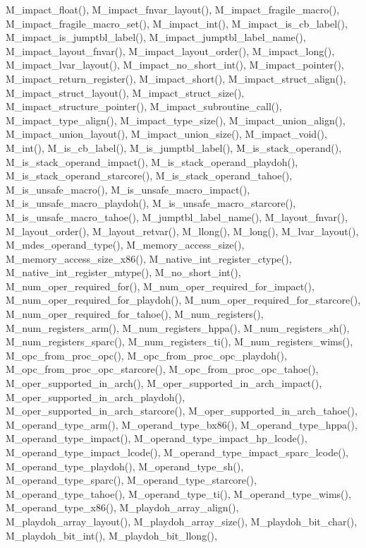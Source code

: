 M\_\-impact\_\-float(), M\_\-impact\_\-fnvar\_\-layout(), M\_\-impact\_\-fragile\_\-macro(), M\_\-impact\_\-fragile\_\-macro\_\-set(), M\_\-impact\_\-int(), M\_\-impact\_\-is\_\-cb\_\-label(), M\_\-impact\_\-is\_\-jumptbl\_\-label(), M\_\-impact\_\-jumptbl\_\-label\_\-name(), M\_\-impact\_\-layout\_\-fnvar(), M\_\-impact\_\-layout\_\-order(), M\_\-impact\_\-long(), M\_\-impact\_\-lvar\_\-layout(), M\_\-impact\_\-no\_\-short\_\-int(), M\_\-impact\_\-pointer(), M\_\-impact\_\-return\_\-register(), M\_\-impact\_\-short(), M\_\-impact\_\-struct\_\-align(), M\_\-impact\_\-struct\_\-layout(), M\_\-impact\_\-struct\_\-size(), M\_\-impact\_\-structure\_\-pointer(), M\_\-impact\_\-subroutine\_\-call(), M\_\-impact\_\-type\_\-align(), M\_\-impact\_\-type\_\-size(), M\_\-impact\_\-union\_\-align(), M\_\-impact\_\-union\_\-layout(), M\_\-impact\_\-union\_\-size(), M\_\-impact\_\-void(), M\_\-int(), M\_\-is\_\-cb\_\-label(), M\_\-is\_\-jumptbl\_\-label(), M\_\-is\_\-stack\_\-operand(), M\_\-is\_\-stack\_\-operand\_\-impact(), M\_\-is\_\-stack\_\-operand\_\-playdoh(), M\_\-is\_\-stack\_\-operand\_\-starcore(), M\_\-is\_\-stack\_\-operand\_\-tahoe(), M\_\-is\_\-unsafe\_\-macro(), M\_\-is\_\-unsafe\_\-macro\_\-impact(), M\_\-is\_\-unsafe\_\-macro\_\-playdoh(), M\_\-is\_\-unsafe\_\-macro\_\-starcore(), M\_\-is\_\-unsafe\_\-macro\_\-tahoe(), M\_\-jumptbl\_\-label\_\-name(), M\_\-layout\_\-fnvar(), M\_\-layout\_\-order(), M\_\-layout\_\-retvar(), M\_\-llong(), M\_\-long(), M\_\-lvar\_\-layout(), M\_\-mdes\_\-operand\_\-type(), M\_\-memory\_\-access\_\-size(), M\_\-memory\_\-access\_\-size\_\-x86(), M\_\-native\_\-int\_\-register\_\-ctype(), M\_\-native\_\-int\_\-register\_\-mtype(), M\_\-no\_\-short\_\-int(), M\_\-num\_\-oper\_\-required\_\-for(), M\_\-num\_\-oper\_\-required\_\-for\_\-impact(), M\_\-num\_\-oper\_\-required\_\-for\_\-playdoh(), M\_\-num\_\-oper\_\-required\_\-for\_\-starcore(), M\_\-num\_\-oper\_\-required\_\-for\_\-tahoe(), M\_\-num\_\-registers(), M\_\-num\_\-registers\_\-arm(), M\_\-num\_\-registers\_\-hppa(), M\_\-num\_\-registers\_\-sh(), M\_\-num\_\-registers\_\-sparc(), M\_\-num\_\-registers\_\-ti(), M\_\-num\_\-registers\_\-wims(), M\_\-opc\_\-from\_\-proc\_\-opc(), M\_\-opc\_\-from\_\-proc\_\-opc\_\-playdoh(), M\_\-opc\_\-from\_\-proc\_\-opc\_\-starcore(), M\_\-opc\_\-from\_\-proc\_\-opc\_\-tahoe(), M\_\-oper\_\-supported\_\-in\_\-arch(), M\_\-oper\_\-supported\_\-in\_\-arch\_\-impact(), M\_\-oper\_\-supported\_\-in\_\-arch\_\-playdoh(), M\_\-oper\_\-supported\_\-in\_\-arch\_\-starcore(), M\_\-oper\_\-supported\_\-in\_\-arch\_\-tahoe(), M\_\-operand\_\-type\_\-arm(), M\_\-operand\_\-type\_\-bx86(), M\_\-operand\_\-type\_\-hppa(), M\_\-operand\_\-type\_\-impact(), M\_\-operand\_\-type\_\-impact\_\-hp\_\-lcode(), M\_\-operand\_\-type\_\-impact\_\-lcode(), M\_\-operand\_\-type\_\-impact\_\-sparc\_\-lcode(), M\_\-operand\_\-type\_\-playdoh(), M\_\-operand\_\-type\_\-sh(), M\_\-operand\_\-type\_\-sparc(), M\_\-operand\_\-type\_\-starcore(), M\_\-operand\_\-type\_\-tahoe(), M\_\-operand\_\-type\_\-ti(), M\_\-operand\_\-type\_\-wims(), M\_\-operand\_\-type\_\-x86(), M\_\-playdoh\_\-array\_\-align(), M\_\-playdoh\_\-array\_\-layout(), M\_\-playdoh\_\-array\_\-size(), M\_\-playdoh\_\-bit\_\-char(), M\_\-playdoh\_\-bit\_\-int(), M\_\-playdoh\_\-bit\_\-llong(), 